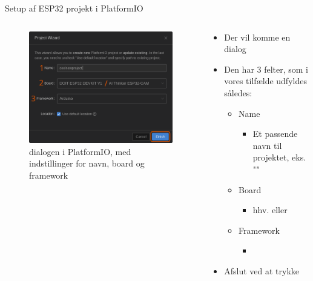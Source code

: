 \documentclass[aspectratio=169]{beamer}
\begin{document}
\begin{frame}{Setup af ESP32 projekt i PlatformIO}
\begin{columns}
	\begin{column}{0.5\textwidth}
		\begin{figure}
  			\includegraphics[height=0.7\textheight,keepaspectratio=true]{assets/pictures/pio-project-2.png}
  			\caption{ dialogen i PlatformIO, med indstillinger for navn, board og framework}
  			\label{fig:pio-project2}
		\end{figure}
	\end{column}
	\begin{column}{0.5\textwidth}
		\begin{textBox}
			\begin{itemize}
				\item Der vil komme en  dialog
				\item Den har 3 felter, som i vores tilfælde udfyldes således:
				\begin{itemize}
					\item Name
					\begin{itemize}
						\item Et passende navn til projektet, eks. ""
					\end{itemize}
					\item Board
					\begin{itemize}
						\item hhv.  eller 
					\end{itemize}
					\item Framework
					\begin{itemize}
						\item {}
					\end{itemize}
				\end{itemize}
				\item Afslut ved at trykke 
			\end{itemize}
		\end{textBox}
	\end{column}
\end{columns}
\end{frame}
\end{document}
